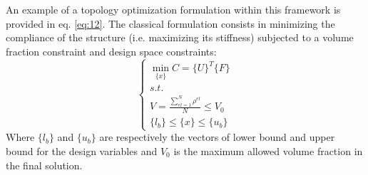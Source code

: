 An example of a topology optimization formulation within this framework is provided in eq. \eqref{eq:12}. The classical formulation consists in minimizing the compliance of the structure (i.e. maximizing its stiffness) subjected to a volume fraction constraint and design space constraints:
\begin{equation}
\label{eq:12}
    \begin{cases}
    \min_{\lbrace{x}\rbrace}{C=\lbrace{U}\rbrace^T\lbrace{F}\rbrace} \\
    s.t. \\
    V=\frac{\sum_{el=1}^{N}{\rho^{el}}}{N}\leq V_0\\
  \lbrace{l_b}\rbrace \leq \lbrace{x}\rbrace\leq\lbrace{u_b}\rbrace
    \end{cases}
\end{equation}
Where $\lbrace{l_b}\rbrace$ and $\lbrace{u_b}\rbrace$ are respectively the vectors of lower bound and upper bound for the design variables and $V_0$ is the maximum allowed volume fraction in the final solution.
